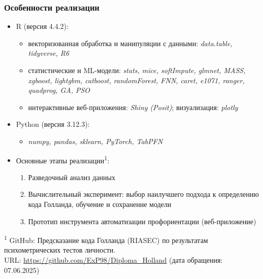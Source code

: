 \documentclass
  [ russian
  , aspectratio=169 %
  ] {beamer}
\begin{document}
\begin{frame}
    \frametitle{Особенности реализации}
    \begin{itemize}
        \item R (версия 4.4.2):
        \begin{itemize}
            \item векторизованная обработка и манипуляции с данными: \textit{data.table, tidyverse, R6}
            \item статистические и ML-модели: \textit{stats, mice, softImpute, glmnet, MASS, xgboost, lightgbm, catboost, randomForest, FNN, caret, e1071, ranger, quadprog, GA, PSO}
            \item интерактивные веб-приложения: \textit{Shiny (Posit)}; визуализация: \textit{plotly}
        \end{itemize}
        
        \vspace{0.2em}
        \item Python (версия 3.12.3):
        \begin{itemize}
            \item \textit{numpy, pandas, sklearn, PyTorch, TabPFN}
        \end{itemize}

        \vspace{0.2em}
        \item Основные этапы реализации\textsuperscript{1}:
        \begin{enumerate}
            \item Разведочный анализ данных
            \item Вычислительный эксперимент: выбор наилучшего подхода к определению кода Голланда, обучение и сохранение модели
            \item Прототип инструмента автоматизации профориентации (веб-приложение) 
        \end{enumerate}
    \end{itemize}
    
    \btVFill
    {\footnotesize
        \textsuperscript{1} GitHub: Предсказание кода Голланда (RIASEC) по результатам психометрических тестов личности.\\
        \quad URL: \url{https://github.com/ExP98/Diploma_Holland} (дата обращения: 07.06.2025)
    }
\end{frame}
\end{document}
